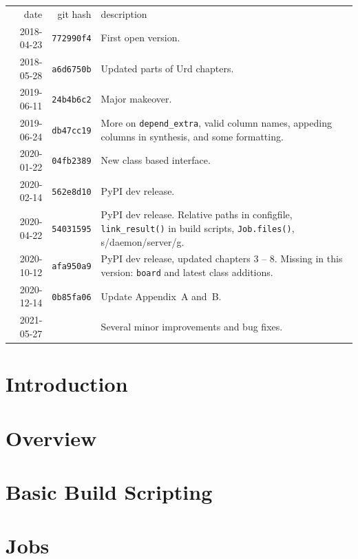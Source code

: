 \documentclass[a4paper]{report}
\newlength{\onechartt}
\newcommand\inputfile[1]{%
    \InputIfFileExists{#1}{}{\typeout{No file #1.}}\hspace{-\onechartt}%
}
\begin{document}
\begin{tabular}{rrp{8cm}}
 date       & git hash          & description\\[0.75ex]
 2018-04-23 & \texttt{772990f4} & First open version.\\
 2018-05-28 & \texttt{a6d6750b} & Updated parts of Urd chapters.\\
 2019-06-11 & \texttt{24b4b6c2} & Major makeover.\\
 2019-06-24 & \texttt{db47cc19} & More on \texttt{depend\_extra}, valid column names, appeding columns in
  synthesis, and some formatting.\\
 2020-01-22 & \texttt{04fb2389} &  New class based interface.\\
 2020-02-14 & \texttt{562e8d10} & PyPI dev release.\\

 2020-04-22 & \texttt{54031595} & PyPI dev release.
 Relative paths in configfile, \texttt{link\_result()} in build
 scripts, \texttt{Job.files()}, s/daemon/server/g.\\

 2020-10-12 & \texttt{afa950a9} & PyPI dev release,
 updated chapters 3 -- 8.  Missing in this version: \texttt{board} and
 latest class additions.\\

 2020-12-14 & \texttt{0b85fa06} & Update Appendix~A and~B.\\
 2021-05-27 & \texttt{\inputfile{gitrevision}} & Several minor improvements and bug fixes.\\
\end{tabular}

\newpage
\tableofcontents

\chapter{Introduction}


\chapter{Overview}


\chapter{Basic Build Scripting}


\chapter{Jobs}

\end{document}
